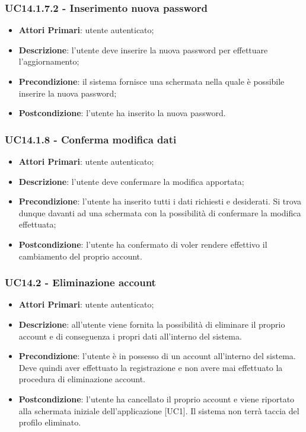 \subsubsection{UC14.1.7.2 - Inserimento nuova password}
\begin{itemize}
	\item \textbf{Attori Primari}: utente autenticato;
	\item \textbf{Descrizione}: l'utente deve inserire la nuova password per effettuare l'aggiornamento;
	\item \textbf{Precondizione}: il sistema fornisce una schermata nella quale è possibile inserire la nuova password;
	\item \textbf{Postcondizione}: l'utente ha inserito la nuova password.
\end{itemize}

\subsubsection{UC14.1.8 - Conferma modifica dati}
\begin{itemize}
	\item \textbf{Attori Primari}: utente autenticato;
	\item \textbf{Descrizione}: l'utente deve 
	confermare la modifica apportata;
	\item \textbf{Precondizione}: l'utente ha inserito tutti i dati richiesti e desiderati. Si trova dunque davanti ad una schermata con la possibilità di confermare la modifica effettuata;
	\item \textbf{Postcondizione}: l'utente ha confermato di voler rendere effettivo il cambiamento del proprio account.
\end{itemize}

\subsubsection{UC14.2 - Eliminazione account}
\begin{itemize}
	\item \textbf{Attori Primari}: utente autenticato;
	\item \textbf{Descrizione}: all'utente viene fornita la possibilità di eliminare il proprio account e di conseguenza i propri dati all'interno del sistema.
	\item \textbf{Precondizione}: l'utente è in possesso di un account all'interno del sistema. Deve quindi aver effettuato la registrazione e non avere mai effettuato la procedura di eliminazione account.
	\item \textbf{Postcondizione}: l'utente ha cancellato il proprio account e viene riportato alla schermata iniziale dell'applicazione [UC1]. Il sistema non terrà taccia del profilo eliminato.
\end{itemize}

